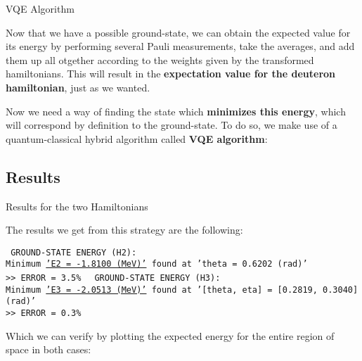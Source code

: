 \documentclass[9pt, handout, aspectratio=169]{beamer}		%
\begin{document}
	\begin{frame}{VQE Algorithm}

		Now that we have a possible ground-state, we can obtain the expected value for its energy by performing several Pauli measurements, take the averages, and add them up all otgether according to the weights given by the transformed hamiltonians. This will result in the \textbf{expectation value for the deuteron hamiltonian}, just as we wanted.

		\medskip

		Now we need a way of finding the state which \textbf{minimizes this energy}, which will correspond by definition to the ground-state. To do so, we make use of a quantum-classical hybrid algorithm called \textbf{VQE algorithm}:

	\end{frame}


	\subsection{Results}

	\begin{frame}{Results for the two Hamiltonians}

		The results we get from this strategy are the following:

		\bigskip

		\texttt{
			GROUND-STATE ENERGY (H2): \\
			Minimum \underline{'E2 = -1.8100 (MeV)'} found at 'theta = 0.6202 (rad)' \\
			>> ERROR = 3.5\% }
		\medskip
		\texttt{
			GROUND-STATE ENERGY (H3): \\
			Minimum \underline{'E3 = -2.0513 (MeV)'} found at '[theta, eta] = [0.2819, 0.3040] (rad)' \\
			>> ERROR = 0.3\% }

		\bigskip

		Which we can verify by plotting the expected energy for the entire region of space in both cases:

		\begin{multicols}{2}
			\columnbreak
		\end{multicols}

	\end{frame}

\end{document}
